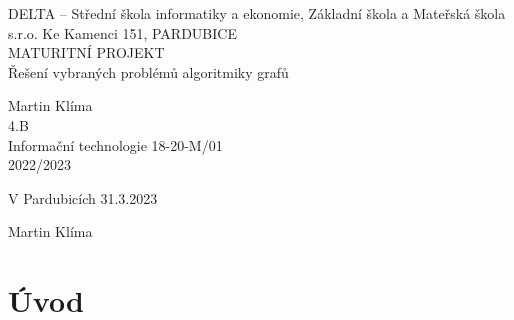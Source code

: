 \documentclass[12pt, titlepage, a4paper]{article}
\begin{document}
    \begin{titlepage}
        \bfseries{
            \begin{center}
                \Large{DELTA – Střední škola informatiky a ekonomie, Základní škola a Mateřská škola
                s.r.o.
                \newline
                Ke Kamenci 151, PARDUBICE}
                \vspace{0.4 \textheight}\\
                \large{
                    MATURITNÍ PROJEKT
                }\\
                \vspace{14pt}
                \LARGE{
                    Řešení vybraných problémů algoritmiky grafů
                }
                \vspace{0.3 \textheight}
            \end{center}
        \noindent\large{Martin Klíma}\\
        \noindent\large{4.B}\\
        \noindent\large{Informační technologie 18-20-M/01}\\
        \noindent\large{2022/2023}\\
        }
  \end{titlepage}
\clearpage


\clearpage
\vspace*{0.8\textheight}


\vspace{20pt}

\noindent V Pardubicích 31.3.2023 \hspace{150pt}\dotfill{}

\hspace{9.5cm} Martin Klíma
\clearpage
{}\\
\clearpage
\tableofcontents
\newpage

\section{Úvod}
\end{document}
